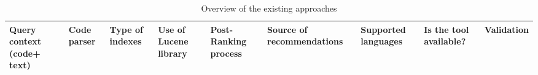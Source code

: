 
\begin{table}[t]
	\footnotesize
	\caption{Overview of the existing approaches}
	\centering
	\begin{tabular}{|p{2.5cm}|p{4.0cm}|p{1.8cm}|} \hline			
		\textbf{Query context (code+ text) }	& 
		\textbf{Code parser}    &
		\textbf{Type of indexes}  & 
		\textbf{Use of Lucene library} &
		\textbf{Post-Ranking process} &
 		\textbf{Source of recommendations} &
		\textbf{Supported languages} & 
		\textbf{Is the tool available?} &
		\textbf{Validation}  \\ \hline	
		
	\end{tabular}
	\label{tab:OverviewCodeSearchers}
	\vspace{-.3cm}
\end{table}